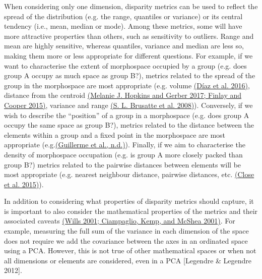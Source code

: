 \documentclass[12pt,letterpaper]{article}
\begin{document}
When considering only one dimension, disparity metrics can be used to reflect the spread of the distribution (e.g. the range, quantiles or variance) or its central tendency (i.e., mean, median or mode).
Among these metrics, some will have more attractive properties than others, such as sensitivity to outliers. Range and mean are highly sensitive, whereas quantiles, variance and median are less so, making them more or less appropriate for different questions.
For example, if we want to characterise the extent of morphospace occupied by a group (e.g. does group A occupy as much space as group B?), metrics related to the spread of the group in the morphospace are most appropriate (e.g. volume \href{https://paperpile.com/c/sTGYvp/47fI}{(Díaz et al. 2016)}, distance from the centroid \href{https://paperpile.com/c/sTGYvp/vTHS+yyNa}{(Melanie J. Hopkins and Gerber 2017; Finlay and Cooper 2015)}, variance and range \href{https://paperpile.com/c/sTGYvp/tGyd}{(S. L. Brusatte et al. 2008)}).
Conversely, if we wish to describe the ``position''
 of a group in a morphospace (e.g. does group A occupy the same space as group B?), metrics related to the distance between the elements within a group and a fixed point in the morphospace are most appropriate (e.g.\href{https://paperpile.com/c/sTGYvp/u1KE}{(Guillerme et al., n.d.)}).
Finally, if we aim to characterise the density of morphospace occupation (e.g. is group A more closely packed than group B?) metrics related to the pairwise distances between elements will be most appropriate (e.g. nearest neighbour distance, pairwise distances, etc. \href{https://paperpile.com/c/sTGYvp/PbSx}{(Close et al. 2015)}).

In addition to considering what properties of disparity metrics should capture, it is important to also consider the mathematical properties of the metrics and their associated caveats \href{https://paperpile.com/c/sTGYvp/nFf7+ROH8}{(Wills 2001; Ciampaglio, Kemp, and McShea 2001)}.
For example, measuring the full sum of the variance in each dimension of the space does not require we add the covariance between the axes in an ordinated space using a PCA.
However, this is not true of other mathematical spaces or when not all dimensions or elements are considered, even in a PCA {[}Legendre \& Legendre 2012{]}.
\end{document}
